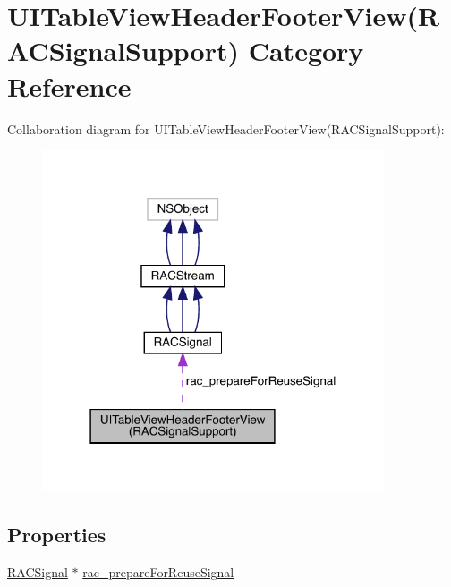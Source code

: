 \hypertarget{category_u_i_table_view_header_footer_view_07_r_a_c_signal_support_08}{}\section{U\+I\+Table\+View\+Header\+Footer\+View(R\+A\+C\+Signal\+Support) Category Reference}
\label{category_u_i_table_view_header_footer_view_07_r_a_c_signal_support_08}


Collaboration diagram for U\+I\+Table\+View\+Header\+Footer\+View(R\+A\+C\+Signal\+Support)\+:\nopagebreak
\begin{figure}[H]
\begin{center}
\leavevmode
\includegraphics[width=286pt]{category_u_i_table_view_header_footer_view_07_r_a_c_signal_support_08__coll__graph}
\end{center}
\end{figure}
\subsection*{Properties}
\begin{DoxyCompactItemize}
\item 
\mbox{\hyperlink{interface_r_a_c_signal}{R\+A\+C\+Signal}} $\ast$ \mbox{\hyperlink{category_u_i_table_view_header_footer_view_07_r_a_c_signal_support_08_a339cfe7747ba066543fd80771cbadb9e}{rac\+\_\+prepare\+For\+Reuse\+Signal}}
\end{DoxyCompactItemize}


